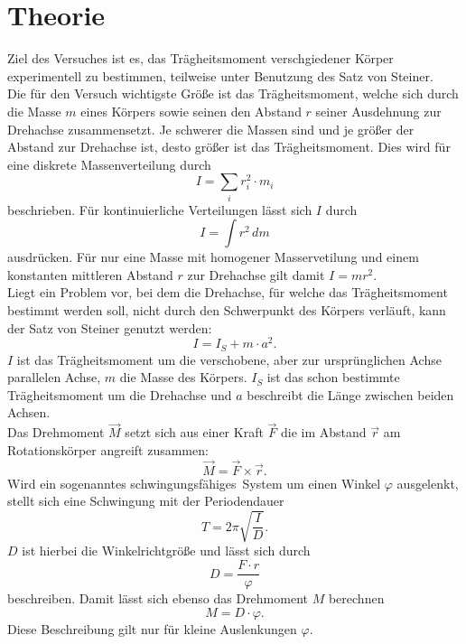 \section{Theorie}
\label{sec:Theorie}
Ziel des Versuches ist es, das Trägheitsmoment verschgiedener Körper
experimentell zu bestimmen, teilweise unter Benutzung des Satz von Steiner.
\\ \noindent
Die für den Versuch wichtigste Größe ist das Trägheitsmoment, welche sich durch die Masse $m$
eines Körpers sowie seinen den Abstand $r$ seiner Ausdehnung zur Drehachse zusammensetzt. Je schwerer die Massen sind und je größer der Abstand 
zur Drehachse ist, desto größer ist das Trägheitsmoment. Dies wird für eine diskrete Massenverteilung durch  
\begin{equation}
    I=\sum_i r_i^2\cdot m_i
\end{equation}
beschrieben.
Für kontinuierliche Verteilungen lässt sich $I$ durch 
\begin{equation}
    I=\int r^2\, dm
\end{equation}
ausdrücken. Für nur eine Masse mit homogener Masservetilung und einem konstanten mittleren Abstand $r$ zur Drehachse gilt damit 
$I=mr^2$. \\ \noindent
Liegt ein Problem vor, bei dem die Drehachse, für welche das Trägheitsmoment bestimmt werden soll,
nicht durch den Schwerpunkt des Körpers verläuft, kann der Satz von Steiner genutzt werden: 
\begin{equation}
    I=I_S+m\cdot a^2.
\end{equation}
$I$ ist das Trägheitsmoment um die verschobene, aber zur ursprünglichen Achse parallelen Achse,
$m$ die Masse des Körpers. $I_S$ ist das schon bestimmte Trägheitsmoment um die Drehachse und $a$
beschreibt die Länge zwischen beiden Achsen.\\ \noindent
Das Drehmoment $\vec M$ setzt sich aus einer Kraft $\vec F$ die im Abstand $\vec r$ am Rotationskörper 
angreift zusammen:
\begin{equation}
    \vec M=\vec F\times\vec r.
\end{equation}
Wird ein sogenanntes \glqq schwingungsfähiges\grqq\, System um einen Winkel $\varphi$ ausgelenkt,
stellt sich eine Schwingung mit der  Periodendauer 
\begin{equation}
    T=2\pi\sqrt{\frac{I}{D}}.
\end{equation}
$D$ ist hierbei die Winkelrichtgröße und lässt sich durch 
\begin{equation}
    D=\frac{F\cdot r}{\varphi} 
\end{equation}
beschreiben. Damit lässt sich ebenso das Drehmoment $M$ berechnen 
\begin{equation}
    M=D\cdot \varphi.
\end{equation}
Diese Beschreibung gilt nur für kleine Auslenkungen $\varphi$.